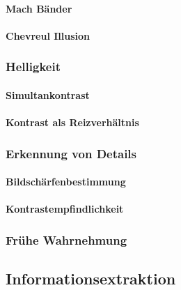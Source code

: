 \documentclass[a4paper, 11pt, accentcolor = tud3b]{tudreport}
\begin{document}
					\paragraph{Mach Bänder} %

					\paragraph{Chevreul Illusion} %

				\subsubsection{Helligkeit} %

					\paragraph{Simultankontrast} %

					\paragraph{Kontrast als Reizverhältnis} %

				\subsubsection{Erkennung von Details} %

					\paragraph{Bildschärfenbestimmung} %

					\paragraph{Kontrastempfindlichkeit} %

				\subsubsection{Frühe Wahrnehmung} %

			\subsection{Informationsextraktion} %
\end{document}
